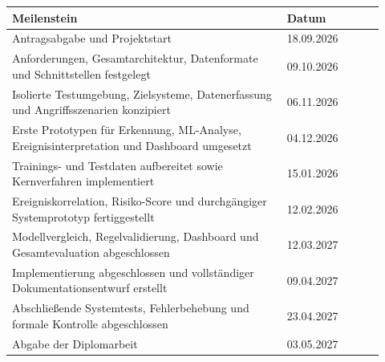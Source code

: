 \begin{tabular}{@{}p{0.68\linewidth}p{0.24\linewidth}@{}}
    \toprule
    \bfseries Meilenstein & \bfseries Datum \\
    \midrule
    Antragsabgabe und Projektstart & 18.09.2026 \\
    Anforderungen, Gesamtarchitektur, Datenformate und Schnittstellen festgelegt & 09.10.2026 \\
    Isolierte Testumgebung, Zielsysteme, Datenerfassung und Angriffsszenarien konzipiert & 06.11.2026 \\
    Erste Prototypen für Erkennung, ML-Analyse, Ereignisinterpretation und Dashboard umgesetzt & 04.12.2026 \\
    Trainings- und Testdaten aufbereitet sowie Kernverfahren implementiert & 15.01.2026 \\
    Ereigniskorrelation, Risiko-Score und durchgängiger Systemprototyp fertiggestellt & 12.02.2026 \\
    Modellvergleich, Regelvalidierung, Dashboard und Gesamtevaluation abgeschlossen & 12.03.2027 \\
    Implementierung abgeschlossen und vollständiger Dokumentationsentwurf erstellt & 09.04.2027 \\
    Abschließende Systemtests, Fehlerbehebung und formale Kontrolle abgeschlossen & 23.04.2027 \\
    Abgabe der Diplomarbeit  & 03.05.2027 \\
  \bottomrule
\end{tabular}
